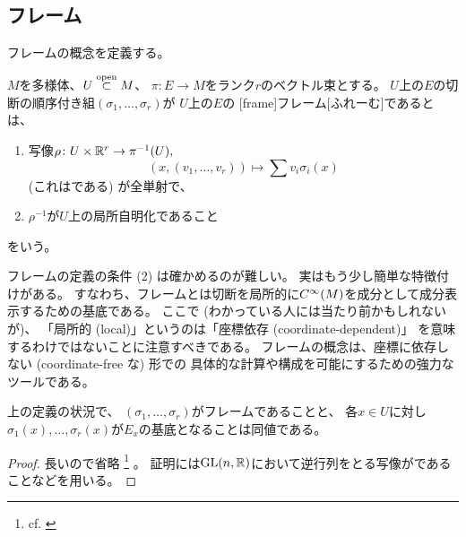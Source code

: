 \documentclass[report]{jlreq}
\begin{document}
\subsection{フレーム}

フレームの概念を定義する。

\begin{definition}[フレーム]
    $M$を多様体、$U \stackrel{\text{open}}{\subset} M$、
    $\pi \colon E \to M$をランク$r$のベクトル束とする。
    $U$上の$E$の切断の順序付き組$(\sigma_1, \dots, \sigma_r)$が
    $U$上の$E$の
    [frame]{フレーム}[ふれーむ]であるとは、
    \begin{enumerate}
        \item 写像$\rho \colon U \times \mathbb{R}^r \to \pi^{-1}(U),$
            \begin{equation}
                (x, (v_1, \dots, v_r)) \mapsto \sum v_i \sigma_i(x)
            \end{equation}
            (これは{\smooth}である) が全単射で、
        \item $\rho^{-1}$が$U$上の局所自明化であること
    \end{enumerate}
    をいう。
\end{definition}

フレームの定義の条件 (2) は確かめるのが難しい。
実はもう少し簡単な特徴付けがある。
すなわち、フレームとは切断を局所的に$C^\infty(M)$を成分として成分表示するための基底である。
ここで (わかっている人には当たり前かもしれないが)、
「局所的 (local)」というのは「座標依存 (coordinate-dependent)」
を意味するわけではないことに注意すべきである。
フレームの概念は、座標に依存しない (coordinate-free な) 形での
具体的な計算や構成を可能にするための強力なツールである。

\begin{proposition}[フレームの特徴付け]
    上の定義の状況で、
    $(\sigma_1, \dots, \sigma_r)$がフレームであることと、
    各$x \in U$に対し
    $\sigma_1(x), \dots, \sigma_r(x)$が$E_x$の基底となることは同値である。
\end{proposition}

\begin{proof}
    長いので省略
    \footnote{
        cf. \cite[p.258]{Lee18}
    }
    。
    証明には$\operatorname{\mathrm{GL}}(n, \mathbb{R})$において逆行列をとる写像が{\smooth}であることなどを用いる。
\end{proof}
\end{document}
